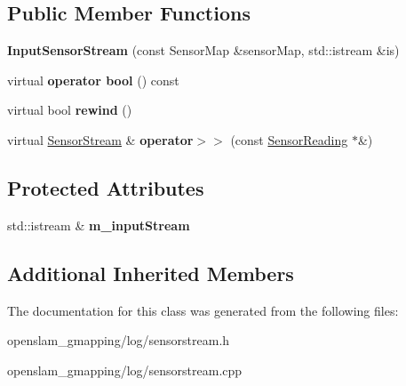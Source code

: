 \subsection*{Public Member Functions}
\begin{DoxyCompactItemize}
\item 
\mbox{\label{classGMapping_1_1InputSensorStream_a9b53282624ae203c1728ee19c65a8c55}} 
{\bfseries Input\+Sensor\+Stream} (const Sensor\+Map \&sensor\+Map, std\+::istream \&is)
\item 
\mbox{\label{classGMapping_1_1InputSensorStream_a8b03d4812b12322980c38f606d45b64b}} 
virtual {\bfseries operator bool} () const
\item 
\mbox{\label{classGMapping_1_1InputSensorStream_abafc274bc156bbcb20bb07b91be2c3fb}} 
virtual bool {\bfseries rewind} ()
\item 
\mbox{\label{classGMapping_1_1InputSensorStream_a2cb13bfd5a78ba2f47a1742f02f1a97d}} 
virtual \hyperlink{classGMapping_1_1SensorStream}{Sensor\+Stream} \& {\bfseries operator$>$$>$} (const \hyperlink{classGMapping_1_1SensorReading}{Sensor\+Reading} $\ast$\&)
\end{DoxyCompactItemize}
\subsection*{Protected Attributes}
\begin{DoxyCompactItemize}
\item 
\mbox{\label{classGMapping_1_1InputSensorStream_aa027c47940f4fb749e951decfcdbe695}} 
std\+::istream \& {\bfseries m\+\_\+input\+Stream}
\end{DoxyCompactItemize}
\subsection*{Additional Inherited Members}


The documentation for this class was generated from the following files\+:\begin{DoxyCompactItemize}
\item 
openslam\+\_\+gmapping/log/sensorstream.\+h\item 
openslam\+\_\+gmapping/log/sensorstream.\+cpp\end{DoxyCompactItemize}

